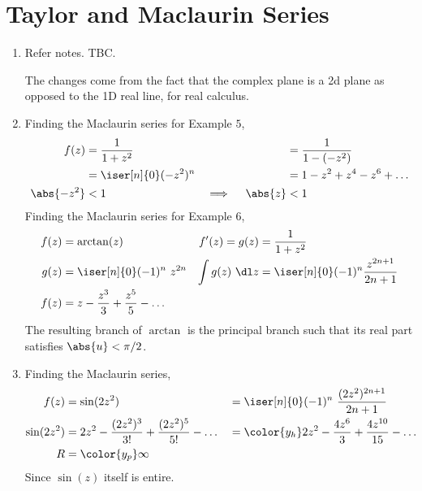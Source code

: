 \section{Taylor and Maclaurin Series}

\begin{enumerate}
    \item Refer notes. TBC. \par
          The changes come from the fact that the complex plane is a 2d plane as opposed
          to the 1D real line, for real calculus.

    \item Finding the Maclaurin series for Example $ 5 $,
          \begin{align}
              f(z)                   & = \frac{1}{1 + z^2}           &
                                     & = \frac{1}{1 - (-z^2)}          \\
                                     & = \iser[n]{0} (-z^2)^n        &
                                     & = 1 - z^2 + z^4 - z^6 + \dots   \\
              \abs{-z^2}             & < 1                           &
              \implies \quad \abs{z} & < 1
          \end{align}
          Finding the Maclaurin series for Example $ 6 $,
          \begin{align}
              f(z)             & = \arctan(z)                                &
              f'(z) = g(z)     & = \frac{1}{1 + z^2}                           \\
              g(z)             & = \iser[n]{0} (-1)^n\ z^{2n}                &
              \int g(z)\ \dl z & = \iser[n]{0} (-1)^n \frac{z^{2n+1}}{2n+1}    \\
              f(z)             & = z - \frac{z^3}{3} + \frac{z^5}{5} - \dots
          \end{align}
          The resulting branch of $ \arctan $ is the principal branch such that its
          real part satisfies $ \abs{u} < \pi/2 $.

    \item Finding the Maclaurin series,
          \begin{align}
              f(z)       & = \sin(2z^2)                                       &
                         & = \iser[n]{0} (-1)^n\
              \frac{(2z^2)^{2n+1}}{2n+1}                                        \\
              \sin(2z^2) & = 2z^2 - \frac{(2z^2)^3}{3!} + \frac{(2z^2)^5}{5!}
              - \dots    &
                         & = \color{y_h} 2z^2 - \frac{4z^6}{3}
              + \frac{4z^{10}}{15} - \dots                                      \\
              R          & = \color{y_p} \infty
          \end{align}
          Since $ \sin(z) $ itself is entire.


\end{enumerate}
